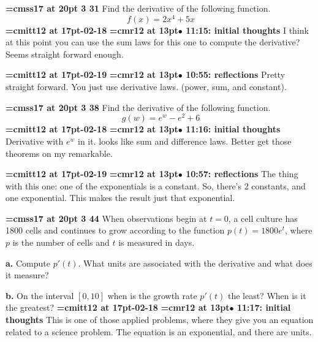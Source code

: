 {\medskip\noindent\bf\font\titlefont=cmss17 at 20pt 3 31}\medskip
Find the derivative of the following function.
$$\
f(x) = 2x^4 + 5x
$$
{\medskip\noindent\bf\font\titlefont=cmitt12 at 17pt-02-18}\medskip
{\smallskip\noindent\bf\font\titlefont=cmr12 at 13pt\titlefont $\bullet$ 11:15: initial thoughts}\smallskip
I think at this point you can use the sum laws for this one to compute the derivative? Seems straight forward enough.
\par

{\medskip\noindent\bf\font\titlefont=cmitt12 at 17pt-02-19}\medskip
{\smallskip\noindent\bf\font\titlefont=cmr12 at 13pt\titlefont $\bullet$ 10:55: reflections}\smallskip
Pretty straight forward. You just use derivative laws. (power, sum, and constant).
\par

{\medskip\noindent\bf\font\titlefont=cmss17 at 20pt 3 38}\medskip
Find the derivative of the following function.
$$\
g(w) = e^w - e^2 + 6
$$
{\medskip\noindent\bf\font\titlefont=cmitt12 at 17pt-02-18}\medskip
{\smallskip\noindent\bf\font\titlefont=cmr12 at 13pt\titlefont $\bullet$ 11:16: initial thoughts}\smallskip
Derivative with $e^w$ in it. looks like sum and difference laws. Better get those theorems on my remarkable.
\par

{\medskip\noindent\bf\font\titlefont=cmitt12 at 17pt-02-19}\medskip
{\smallskip\noindent\bf\font\titlefont=cmr12 at 13pt\titlefont $\bullet$ 10:57: reflections}\smallskip
The thing with this one: one of the exponentials is a constant. So, there's 2 constants, and one exponential. This makes the result just that exponential.
\par

{\medskip\noindent\bf\font\titlefont=cmss17 at 20pt 3 44}\medskip
When observations begin at $t = 0$, a cell culture
has 1800 cells and continues to grow according to the function
$p(t) = 1800e^t$, where $p$ is the number of cells and $t$
is measured in days.
\par {\bf a.} Compute $p'(t)$. What units are associated with
the derivative and what does it measure?
\par {\bf b.} On the interval $[0, 10]$ when is the growth
rate $p'(t)$ the least? When is it the greatest?
{\medskip\noindent\bf\font\titlefont=cmitt12 at 17pt-02-18}\medskip
{\smallskip\noindent\bf\font\titlefont=cmr12 at 13pt\titlefont $\bullet$ 11:17: initial thoughts}\smallskip
This is one of those applied problems, where they give you an equation related to a science problem. The equation is an exponential, and there are units.
\par


